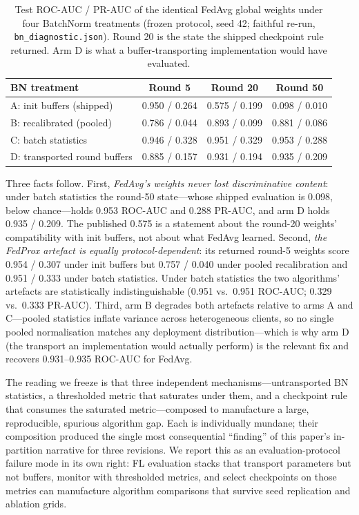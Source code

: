 \begin{table}[t]
\centering
\caption{Test ROC-AUC / PR-AUC of the identical FedAvg global weights
under four BatchNorm treatments (frozen protocol, seed 42; faithful
re-run, \texttt{bn\_diagnostic.json}). Round 20 is the state the
shipped checkpoint rule returned. Arm D is what a buffer-transporting
implementation would have evaluated.}
\label{tab:bndiag}
\small
\begin{tabular}{@{}l c c c@{}}
\toprule
\textbf{BN treatment} & \textbf{Round 5} & \textbf{Round 20} & \textbf{Round 50} \\
\midrule
A: init buffers (shipped) & 0.950 / 0.264 & 0.575 / 0.199 & 0.098 / 0.010 \\
B: recalibrated (pooled) & 0.786 / 0.044 & 0.893 / 0.099 & 0.881 / 0.086 \\
C: batch statistics & 0.946 / 0.328 & 0.951 / 0.329 & 0.953 / 0.288 \\
D: transported round buffers & 0.885 / 0.157 & 0.931 / 0.194 & 0.935 / 0.209 \\
\bottomrule
\end{tabular}
\end{table}

Three facts follow. First, \emph{FedAvg's weights never lost
discriminative content}: under batch statistics the round-50 state---whose
shipped evaluation is 0.098, below chance---holds 0.953 ROC-AUC and
0.288 PR-AUC, and arm D holds 0.935 / 0.209. The published 0.575 is a
statement about the round-20 weights' compatibility with init buffers,
not about what FedAvg learned. Second, \emph{the FedProx artefact is
equally protocol-dependent}: its returned round-5 weights score
0.954 / 0.307 under init buffers but 0.757 / 0.040 under pooled
recalibration and 0.951 / 0.333 under batch statistics. Under batch
statistics the two algorithms' artefacts are statistically
indistinguishable (0.951 vs.\ 0.951 ROC-AUC; 0.329 vs.\ 0.333
PR-AUC). Third, arm B degrades both artefacts relative to arms A and
C---pooled statistics inflate variance across heterogeneous clients,
so no single pooled normalisation matches any deployment
distribution---which is why arm D (the transport an implementation
would actually perform) is the relevant fix and recovers 0.931--0.935
ROC-AUC for FedAvg.

The reading we freeze is that three independent mechanisms---untransported
BN statistics, a thresholded metric that saturates under them, and a
checkpoint rule that consumes the saturated metric---composed to
manufacture a large, reproducible, spurious algorithm gap. Each is
individually mundane; their composition produced the single most
consequential ``finding'' of this paper's in-partition narrative for
three revisions. We report this as an evaluation-protocol failure mode
in its own right: FL evaluation stacks that transport parameters but
not buffers, monitor with thresholded metrics, and select checkpoints
on those metrics can manufacture algorithm comparisons that survive
seed replication and ablation grids.

